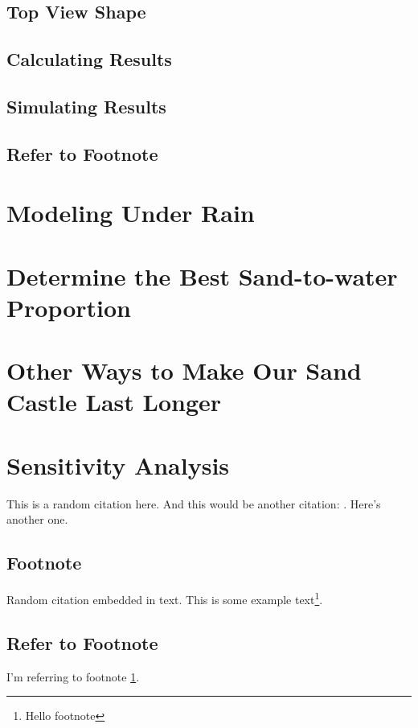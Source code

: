 \documentclass[12pt]{article}
\begin{document}
\subsection{Top View Shape}

\subsection{Calculating Results}
\subsection{Simulating Results}
\subsection{Refer to Footnote} 

\section{Modeling Under Rain}

\section{Determine the Best Sand-to-water Proportion}
\section{Other Ways to Make Our Sand Castle Last Longer}

\section{Sensitivity Analysis}
 
This is a random citation \autocite{LeeRice-4} here.
And this would be another citation: \autocite{AragonRios-30}.
Here's another \autocite{Starobin-32} one.

\subsection{Footnote}
Random citation \autocite{LeeRice-4} embedded in text.
This is some example text\footnote{\label{myfootnote}Hello footnote}.

\subsection{Refer to Footnote}
I'm referring to footnote \ref{myfootnote}.

\newpage
\begin{appendix}
    \listoffigures
    \listoftables
    \listoflistings
    \printbibliography
\end{appendix}
\end{document}
